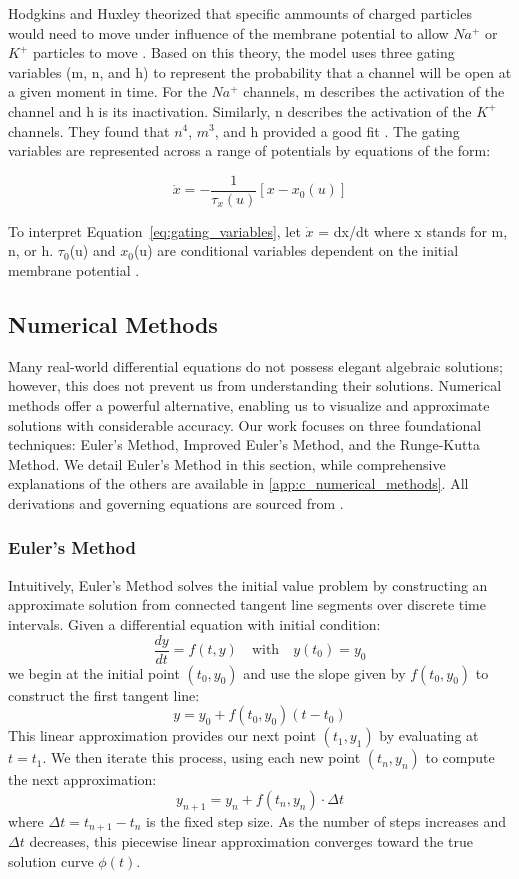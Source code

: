 \documentclass{article} %
\begin{document}
\begin{multicols}{2}
Hodgkins and Huxley theorized that specific ammounts of charged particles would need to move under influence of the membrane potential to allow $Na^+$ or $K^+$ particles to move \cite{Schwiening2012}.
Based on this theory, the model uses three gating variables (m, n, and h) to represent the probability that a channel will be open at a given moment in time. 
For the $Na^+$ channels, m describes the activation of the channel and h is its inactivation. 
Similarly, n describes the activation of the $K^+$ channels.
They found that $n^4$, $m^3$, and h provided a good fit \cite{Schwiening2012}. 
The gating variables are represented across a range of potentials by equations of the form:

\begin{dmath}
    \dot{x} = -\frac{1}{\tau_{x}(u)}[x - x_{0}(u)]
    \label{eq:gating_variables}
\end{dmath}

To interpret Equation~\ref{eq:gating_variables}, let $\dot{x}$ = dx/dt where x stands for m, n, or h. $\tau_0$(u) and $x_0$(u) are conditional variables dependent on the initial membrane potential \cite{Gerstner2014}.

\subsection{Numerical Methods}
\label{subsec:numerical_methods}

Many real-world differential equations do not possess elegant algebraic solutions; however, this does not prevent us from understanding their solutions. 
Numerical methods offer a powerful alternative, enabling us to visualize and approximate solutions with considerable accuracy. 
Our work focuses on three foundational techniques: Euler's Method, Improved Euler's Method, and the Runge-Kutta Method. 
We detail Euler's Method in this section, while comprehensive explanations of the others are available in \ref{app:c_numerical_methods}. 
All derivations and governing equations are sourced from \cite{brannan2015differential}.

\subsubsection{Euler's Method}
\label{subsubsec:euler_method}

Intuitively, Euler's Method solves the initial value problem by constructing an approximate solution from connected tangent line segments over discrete time intervals. 
Given a differential equation with initial condition:
\[
    \frac{dy}{dt} = f(t, y) \quad \text{with} \quad y(t_0) = y_0
\]
we begin at the initial point $(t_0, y_0)$ and use the slope given by $f(t_0, y_0)$ to construct the first tangent line:
\[
    y = y_0 + f(t_0, y_0)(t - t_0)
\]
This linear approximation provides our next point $(t_1, y_1)$ by evaluating at $t = t_1$. We then iterate this process, using each new point $(t_n, y_n)$ to compute the next approximation:
\[
    y_{n+1} = y_n + f(t_n, y_n) \cdot \Delta t
\]
where $\Delta t = t_{n+1} - t_n$ is the fixed step size. 
As the number of steps increases and $\Delta t$ decreases, this piecewise linear approximation converges toward the true solution curve $\phi(t)$.


\end{multicols}
\end{document}
